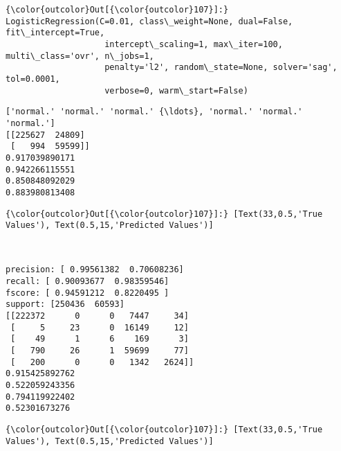 \documentclass[11pt]{article}
\begin{document}
\begin{Verbatim}[commandchars=\\\{\}]
{\color{outcolor}Out[{\color{outcolor}107}]:} LogisticRegression(C=0.01, class\_weight=None, dual=False, fit\_intercept=True,
                    intercept\_scaling=1, max\_iter=100, multi\_class='ovr', n\_jobs=1,
                    penalty='l2', random\_state=None, solver='sag', tol=0.0001,
                    verbose=0, warm\_start=False)
\end{Verbatim}
            
    \begin{Verbatim}[commandchars=\\\{\}]
['normal.' 'normal.' 'normal.' {\ldots}, 'normal.' 'normal.' 'normal.']
[[225627  24809]
 [   994  59599]]
0.917039890171
0.942266115551
0.850848092029
0.883980813408

    \end{Verbatim}

\begin{Verbatim}[commandchars=\\\{\}]
{\color{outcolor}Out[{\color{outcolor}107}]:} [Text(33,0.5,'True Values'), Text(0.5,15,'Predicted Values')]
\end{Verbatim}
            
    \begin{center}
    \end{center}
    { \hspace*{\fill} \\}
    
    \begin{Verbatim}[commandchars=\\\{\}]
precision: [ 0.99561382  0.70608236]
recall: [ 0.90093677  0.98359546]
fscore: [ 0.94591212  0.8220495 ]
support: [250436  60593]
[[222372      0      0   7447     34]
 [     5     23      0  16149     12]
 [    49      1      6    169      3]
 [   790     26      1  59699     77]
 [   200      0      0   1342   2624]]
0.915425892762
0.522059243356
0.794119922402
0.52301673276

    \end{Verbatim}

\begin{Verbatim}[commandchars=\\\{\}]
{\color{outcolor}Out[{\color{outcolor}107}]:} [Text(33,0.5,'True Values'), Text(0.5,15,'Predicted Values')]
\end{Verbatim}
            
\end{document}
